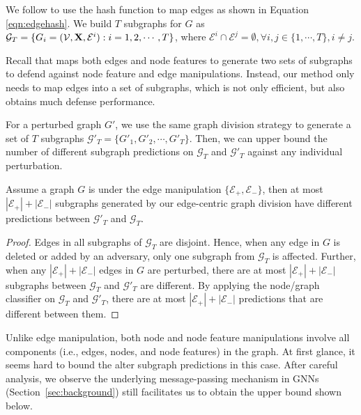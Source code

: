 We follow \cite{xia2024gnncert} to 
use the hash function to map edges as shown in Equation \ref{eqn:edgehash}. 
We build $T$ subgraphs for $G$ as $\mathcal{G}_T = \{ {G}_i = (\mathcal{V},{\bf X}, \mathcal{E}^i): i=1,2,\cdots, T\}$, where 
$\mathcal{E}^i \cap \mathcal{E}^j =  \emptyset, \forall i,j \in \{1, \cdots, T\}, i \neq j$. 



Recall that \cite{xia2024gnncert} maps both edges and node features to generate two sets of subgraphs to defend against node feature and edge manipulations. Instead, our method only needs to map edges into a set of subgraphs, which is not only efficient, but also obtains much defense performance. 

For a perturbed graph $G'$, we use the same graph division strategy to generate a set of $T$ subgraphs $\mathcal{G}'_T = \{G'_1, G'_2, \cdots, G'_T\}$. Then, we can upper bound the number of different subgraph predictions on $\mathcal{G}_T$ and $\mathcal{G}'_T$ against any individual perturbation. 

\begin{theorem}[]
\label{thm:edgeperturb}
Assume a graph $G$ is under the edge manipulation $\{\mathcal{E}_+,\mathcal{E}_-\}$, 
then at most $|\mathcal{E}_+| + |\mathcal{E}_-|$ subgraphs generated by our edge-centric graph division have different predictions between $\mathcal{G}'_T$ and $\mathcal{G}_T$. 
\end{theorem}

\begin{proof}
Edges in all subgraphs of $\mathcal{G}_T$ are disjoint. 
Hence, when any edge in $G$ is deleted or added by an adversary, only one subgraph from $\mathcal{G}_T$ is affected. Further, when any $|\mathcal{E}_+| + |\mathcal{E}_-|$ edges in $G$ are perturbed, there are at most $|\mathcal{E}_+| + |\mathcal{E}_-|$ subgraphs between $\mathcal{G}_T$ and $\mathcal{G}'_T$ are different.
By applying the node/graph classifier on $\mathcal{G}_T$ and $\mathcal{G}'_T$, there are at most $|\mathcal{E}_+| + |\mathcal{E}_-|$ predictions that are different between them.  
\end{proof}


 Unlike edge manipulation, both node and node feature manipulations involve all components (i.e., edges, nodes, and node features) in the graph. At first glance, it seems hard to bound the alter subgraph predictions in this case. After careful analysis, we observe 
 the underlying  message-passing mechanism in GNNs (Section~\ref{sec:background}) still facilitates us to obtain the upper bound shown below. 

